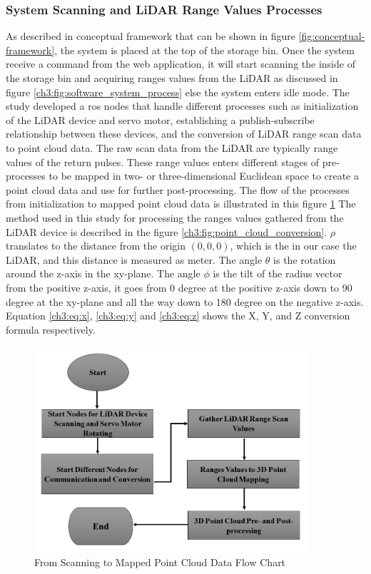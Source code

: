 
\subsubsection{System Scanning and LiDAR Range Values Processes}
As described in conceptual framework that can be shown in figure \ref{fig:conceptual-framework}, the system is placed at the top of the storage bin. Once the system receive a command from the web application, it will start scanning the inside of the storage bin and acquiring ranges values from the LiDAR as discussed in figure \ref{ch3:fig:software_system_process} else the system enters idle mode. The study developed a ros nodes that handle different processes such as initialization of the LiDAR device and servo motor, establishing a publish-subscribe relationship between these devices, and the conversion of LiDAR range scan data to point cloud data. The raw scan data from the LiDAR are typically range values of the return pulses. These range values enters different stages of pre-processes to be mapped in two- or three-dimensional Euclidean space to create a point cloud data and use for further post-processing. The flow of the processes from initialization to mapped point cloud data is illustrated in this figure \ref{ch3:fig:scanning-to-pc-flow-chart} The method used in this study for processing the ranges values gathered from the LiDAR device is described in the figure \ref{ch3:fig:point_cloud_conversion}.  $\rho$ translates to the distance from the origin $(0,0,0)$, which is the in our case the LiDAR, and this distance is measured as meter. The angle $\theta$ is the rotation around the z-axis in the xy-plane. The angle $\phi$ is the tilt of the radius vector from the positive z-axis, it goes from 0 degree at the positive z-axis down to 90 degree at the xy-plane and all the way down to 180 degree on the negative z-axis. Equation \ref{ch3:eq:x}, \ref{ch3:eq:y} and \ref{ch3:eq:z} shows the X, Y, and Z conversion formula respectively.

\begin{figure}[H]
	\centering
	\includegraphics[width=0.9\textwidth]{Figures/scanning-to-pc-flow-chart}
	\caption{From Scanning to Mapped Point Cloud Data Flow Chart}
	\label{ch3:fig:scanning-to-pc-flow-chart}
\end{figure}

